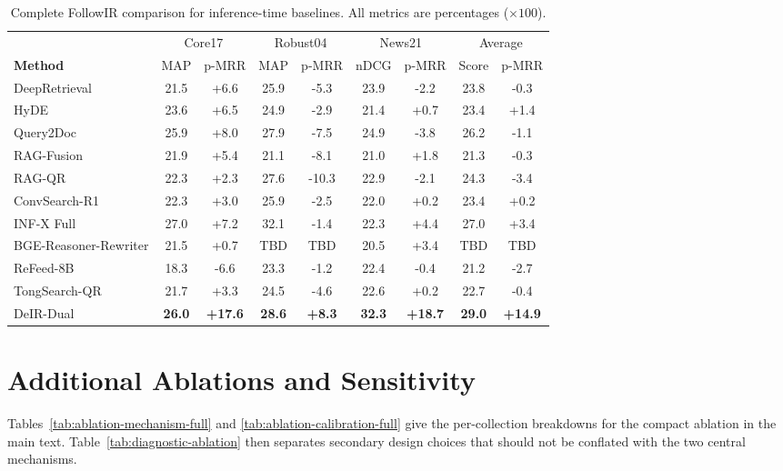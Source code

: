 \documentclass[letterpaper]{article}
\begin{document}
\begin{table}[!t]
\centering
\small
\begin{tabular}{l|cc|cc|cc|cc}
\toprule
& \multicolumn{2}{c|}{Core17} & \multicolumn{2}{c|}{Robust04} & \multicolumn{2}{c|}{News21} & \multicolumn{2}{c}{Average} \\
\cmidrule(lr){2-3} \cmidrule(lr){4-5} \cmidrule(lr){6-7} \cmidrule(lr){8-9}
\textbf{Method} & MAP & p-MRR & MAP & p-MRR & nDCG & p-MRR & Score & p-MRR \\
\midrule
DeepRetrieval & 21.5 & +6.6 & 25.9 & -5.3 & 23.9 & -2.2 & 23.8 & -0.3 \\
HyDE & 23.6 & +6.5 & 24.9 & -2.9 & 21.4 & +0.7 & 23.4 & +1.4 \\
Query2Doc & 25.9 & +8.0 & 27.9 & -7.5 & 24.9 & -3.8 & 26.2 & -1.1 \\
RAG-Fusion & 21.9 & +5.4 & 21.1 & -8.1 & 21.0 & +1.8 & 21.3 & -0.3 \\
RAG-QR & 22.3 & +2.3 & 27.6 & -10.3 & 22.9 & -2.1 & 24.3 & -3.4 \\
ConvSearch-R1 & 22.3 & +3.0 & 25.9 & -2.5 & 22.0 & +0.2 & 23.4 & +0.2 \\
INF-X Full & 27.0 & +7.2 & 32.1 & -1.4 & 22.3 & +4.4 & 27.0 & +3.4 \\
BGE-Reasoner-Rewriter & 21.5 & +0.7 & \textnormal{TBD} & \textnormal{TBD} & 20.5 & +3.4 & \textnormal{TBD} & \textnormal{TBD} \\
ReFeed-8B & 18.3 & -6.6 & 23.3 & -1.2 & 22.4 & -0.4 & 21.2 & -2.7 \\
TongSearch-QR & 21.7 & +3.3 & 24.5 & -4.6 & 22.6 & +0.2 & 22.7 & -0.4 \\
\midrule
DeIR-Dual & \textbf{26.0} & \textbf{+17.6} & \textbf{28.6} & \textbf{+8.3} & \textbf{32.3} & \textbf{+18.7} & \textbf{29.0} & \textbf{+14.9} \\
\bottomrule
\end{tabular}
\caption{Complete FollowIR comparison for inference-time baselines.  All
metrics are percentages ($\times 100$).}
\label{tab:followir-full}
\end{table}

\section{Additional Ablations and Sensitivity}
\label{app:additional-ablations}

Tables~\ref{tab:ablation-mechanism-full} and
\ref{tab:ablation-calibration-full} give the per-collection breakdowns
for the compact ablation in the main text.  Table~\ref{tab:diagnostic-ablation}
then separates secondary design choices that should not be conflated with
the two central mechanisms.
\end{document}
